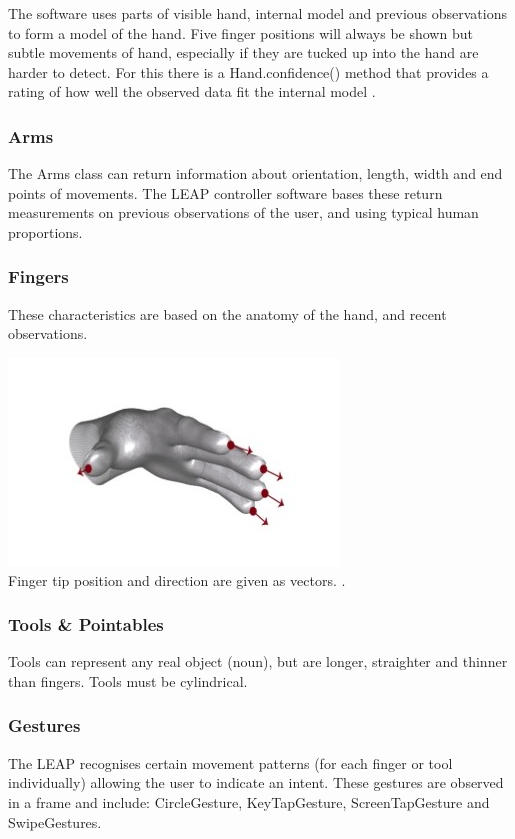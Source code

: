 \documentclass[10pt]{article}
\begin{document}
The software uses parts of visible hand, internal model and previous observations to form a model of the hand. Five finger positions will always be shown but subtle movements of hand, especially if they are tucked up into the hand are harder to detect. For this there is a Hand.confidence() method that provides a rating of how well the observed data fit the internal model \cite{leap}.

\subsubsection{Arms}
The Arms class can return information about orientation, length, width and end points of movements. The LEAP controller software bases these return measurements on previous observations of the user, and using typical human proportions.

\subsubsection{Fingers}
These characteristics are based on the anatomy of the hand, and recent observations. 

\begin{center}
\includegraphics[scale=0.7]{fingers}\\
Finger tip position and direction are given as vectors. \cite{leap}.
\end{center}


\subsubsection{Tools \& Pointables}
Tools can represent any real object (noun), but are longer, straighter and thinner than fingers. Tools must be cylindrical.

\subsubsection{Gestures}
The LEAP recognises certain movement patterns (for each finger or tool individually) allowing the user to indicate an intent. These gestures are observed in a frame and include: CircleGesture, KeyTapGesture, ScreenTapGesture and SwipeGestures.
\end{document}
